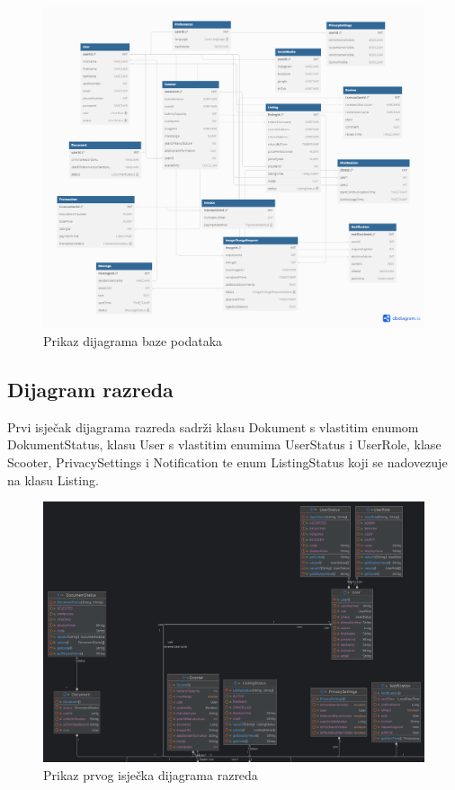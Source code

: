 \begin{figure} [H]
	
	\includegraphics[width=1\linewidth]{slike/RelacijskiDijagramBP.png}
	\centering
	\caption{Prikaz dijagrama baze podataka}
	\label{fig:Prikaz dijagrama baze podataka}
\end{figure}

\subsection{Dijagram razreda}

Prvi isječak dijagrama razreda sadrži klasu Dokument s vlastitim enumom DokumentStatus, klasu User s vlastitim enumima UserStatus i UserRole, klase Scooter, PrivacySettings i Notification te enum ListingStatus koji se nadovezuje na klasu Listing.
\begin{figure} [H]

	\includegraphics[width=1\linewidth]{slike/ClassDiagram1.png}
	\centering
	\caption{Prikaz prvog isječka dijagrama razreda}
	\label{fig:Prikaz prvog isječka dijagrama razreda}
\end{figure}

